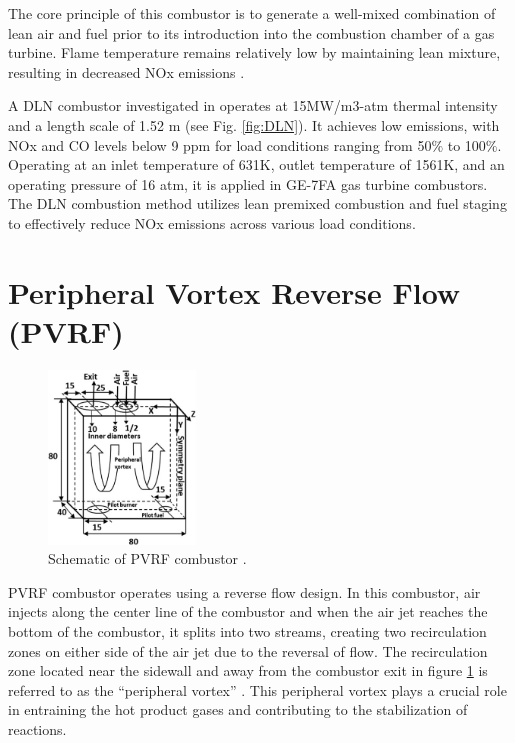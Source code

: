 The core principle of this combustor is to generate a well-mixed combination of lean air and fuel prior to its introduction into the combustion chamber of a gas turbine. Flame temperature remains relatively low by maintaining lean mixture, resulting in decreased NOx emissions \cite{SKG2017}. 

A DLN combustor investigated in \cite{Vandervort1362661} operates at 15MW/m3-atm thermal intensity and a length scale of 1.52 m (see Fig. \ref{fig:DLN}). It achieves low emissions, with NOx and CO levels below 9 ppm for load conditions ranging from 50$\%$ to 100$\%$. Operating at an inlet temperature of 631K, outlet temperature of 1561K, and an operating pressure of 16 atm, it is applied in GE-7FA gas turbine combustors. The DLN combustion method utilizes lean premixed combustion and fuel staging to effectively reduce NOx emissions across various load conditions.

\section{Peripheral Vortex Reverse Flow (PVRF)}

\begin{figure}
\vspace{-5mm}
    \centering
    \includegraphics[width=0.35\textwidth]{Chapter2/Images/PVRF.jpg}
    \caption[Schematic of PVRF combustor]{Schematic of PVRF combustor \cite{AHMAD2023101200}.}
    \label{fig:Ch2PVRF}
\end{figure}

PVRF combustor operates using a reverse flow design. In this combustor, air injects along the center line of the combustor and when the air jet reaches the bottom of the combustor, it splits into two streams, creating two recirculation zones on either side of the air jet due to the reversal of flow. The recirculation zone located near the sidewall and away from the combustor exit in figure \ref{fig:Ch2PVRF} is referred to as the ``peripheral vortex'' \cite{AHMAD2021100754}. This peripheral vortex plays a crucial role in entraining the hot product gases and contributing to the stabilization of reactions.

